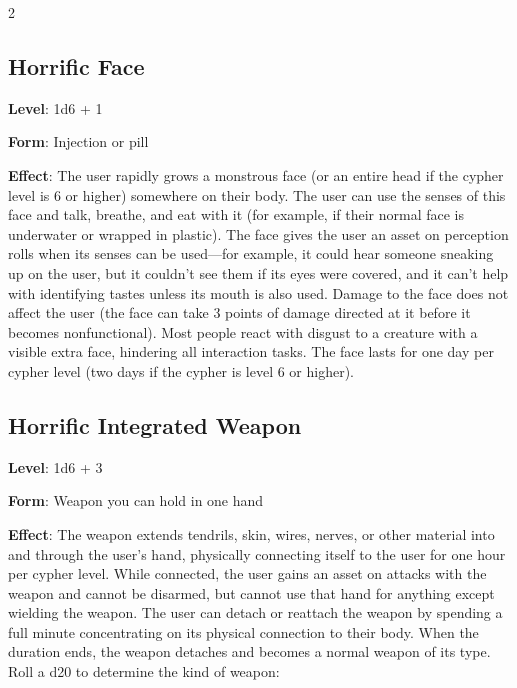\begin{multicols}{2}
\subsection{Horrific Face}

\textbf{Level}: 1d6 + 1

\textbf{Form}: Injection or pill

\textbf{Effect}: The user rapidly grows a monstrous face (or an entire head if the cypher level is 6 or higher) somewhere on their body. The user can use the senses of this face and talk, breathe, and eat with it (for example, if their normal face is underwater or wrapped in plastic). The face gives the user an asset on perception rolls when its senses can be used—for example, it could hear someone sneaking up on the user, but it couldn’t see them if its eyes were covered, and it can’t help with identifying tastes unless its mouth is also used. Damage to the face does not affect the user (the face can take 3 points of damage directed at it before it becomes nonfunctional). Most people react with disgust to a creature with a visible extra face, hindering all interaction tasks. The face lasts for one day per cypher level (two days if the cypher is level 6 or higher).

\subsection{Horrific Integrated Weapon}

\textbf{Level}: 1d6 + 3

\textbf{Form}: Weapon you can hold in one hand 

\textbf{Effect}: The weapon extends tendrils, skin, wires, nerves, or other material into and through the user’s hand, physically connecting itself to the user for one hour per cypher level. While connected, the user gains an asset on attacks with the weapon and cannot be disarmed, but cannot use that hand for anything except wielding the weapon. The user can detach or reattach the weapon by spending a full minute concentrating on its physical connection to their body. When the duration ends, the weapon detaches and becomes a normal weapon of its type. Roll a d20 to determine the kind of weapon:

\end{multicols}

